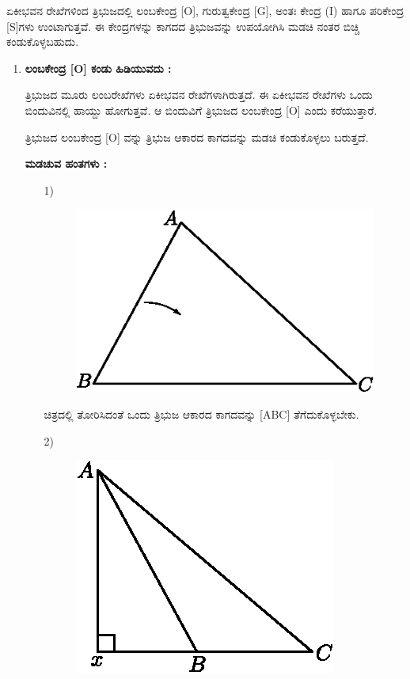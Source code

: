     ಏಕೀಭವನ ರೇಖೆಗಳಿಂದ ತ್ರಿಭುಜದಲ್ಲಿ ಲಂಬಕೇಂದ್ರ [O], ಗುರುತ್ವಕೇಂದ್ರ  [G], ಅಂತಃ ಕೇಂದ್ರ  (I) ಹಾಗೂ ಪರಿಕೇಂದ್ರ [S]ಗಳು ಉಂಟಾಗುತ್ತವೆ. ಈ ಕೇಂದ್ರಗಳನ್ನು ಕಾಗದದ ತ್ರಿಭುಜವನ್ನು ಉಪಯೋಗಿಸಿ ಮಡಚಿ ನಂತರ ಬಿಚ್ಚಿ ಕಂಡುಕೊಳ್ಳಬಹುದು. 
    
    \begin{enumerate}
    \item \textbf{ಲಂಬಕೇಂದ್ರ [O] ಕಂಡು ಹಿಡಿಯುವದು :}
 
 ತ್ರಿಭುಜದ ಮೂರು ಲಂಬರೇಖೆಗಳು ಏಕೀಭವನ ರೇಖೆಗಳಾಗಿರುತ್ತದೆ. ಈ ಏಕೀಭವನ ರೇಖೆಗಳು ಒಂದು ಬಿಂದುವಿನಲ್ಲಿ ಹಾಯ್ದು ಹೋಗುತ್ತವೆ. ಆ ಬಿಂದುವಿಗೆ ತ್ರಿಭುಜದ ಲಂಬಕೇಂದ್ರ [O] ಎಂದು ಕರೆಯುತ್ತಾರೆ. 
 
 ತ್ರಿಭುಜದ ಲಂಬಕೇಂದ್ರ [O] ವನ್ನು ತ್ರಿಭುಜ ಆಕಾರದ ಕಾಗದವನ್ನು ಮಡಚಿ ಕಂಡುಕೊಳ್ಳಲು ಬರುತ್ತದೆ. 
 
    \medskip
    \noindent
 \textbf{ಮಡಚುವ ಹಂತಗಳು :}
 
 \begin{itemize}
 \item[1)]
 ~
 \begin{figure}[H]
\centering
\includegraphics[scale=.98]{src/figure/chap1/fig1-35a.eps}
\end{figure}
 
 ಚಿತ್ರದಲ್ಲಿ ತೋರಿಸಿದಂತೆ ಒಂದು ತ್ರಿಭುಜ ಆಕಾರದ ಕಾಗದವನ್ನು [ABC] ತೆಗೆದುಕೊಳ್ಳಬೇಕು. 
 
 \item[2)] 
 ~
 \begin{figure}[H]
\centering
\includegraphics[scale=.98]{src/figure/chap1/fig1-35b.eps}
\end{figure}
 

\end{itemize}
\end{enumerate}
